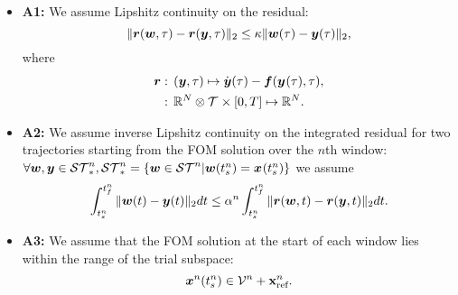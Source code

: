 \begin{itemize}
\item \textbf{A1:} We assume  Lipshitz continuity on the residual:
$$ \| \boldsymbol r(\boldsymbol w,\tau) - \boldsymbol r(\boldsymbol y,\tau)  \|_2 \le \kappa \| \boldsymbol w(\tau) - \boldsymbol y(\tau) \|_2,$$
where  
\begin{align*}
\boldsymbol r &: \, (\boldsymbol y,\tau) \mapsto \dot{\boldsymbol y}(\tau) - \boldsymbol f(\boldsymbol y^{}(\tau),\tau) ,\\
&: \, \mathbb{R}^{N} \otimes \mathcal{T}^{} \times [0,T] \mapsto \mathbb{R}^{N}.
\end{align*}

\item \textbf{A2:} We assume inverse Lipshitz continuity on the integrated residual for two trajectories starting from the FOM solution over the $n$th window:
$\forall \boldsymbol w,\boldsymbol y \in \mathcal{ ST }^{n}_*, \mathcal{ ST }^{n}_* = \{ \boldsymbol w \in \mathcal{ ST }^{n} | \boldsymbol w(t_s^{n}) = {\boldsymbol x}^{}(t_s^{n}) \}$ we assume 
$$  \int_{t_s^{n}}^{t_f^{n}} \| \boldsymbol w(t) - \boldsymbol y(t) \|_2 dt \le  \alpha^{n} \int_{t_s^{n}}^{t_f^{n}} \| \boldsymbol r(\boldsymbol w,t) - \boldsymbol r(\boldsymbol y,t)  \|_2 dt.$$
\item \textbf{A3:} We assume that the FOM solution at the start of each window lies within the range of the trial subspace:
$$ {\boldsymbol x}^{n}(t_s^{n}) \in \mathcal{V }^{n} + \mathbf{x}_\text{ref}^{n}.$$
\end{itemize} 
%

